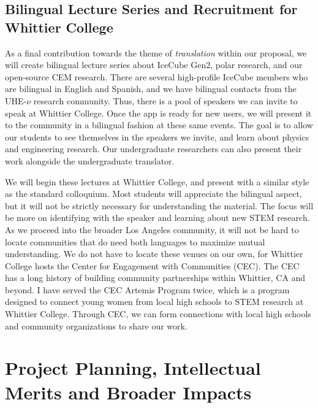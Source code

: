 \documentclass[10pt]{amsart}
\theoremstyle{definition}
\numberwithin{equation}{section}
\begin{document}
\subsection{Bilingual Lecture Series and Recruitment for Whittier College}

As a final contribution towards the theme of \textit{translation} within our proposal, we will create bilingual lecture series about IceCube Gen2, polar research, and our open-source CEM research.  There are several high-profile IceCube members who are bilingual in English and Spanish, and we have bilingual contacts from the UHE-$\nu$ research community.  Thus, there is a pool of speakers we can invite to speak at Whittier College.  Once the app is ready for new users, we will present it to the community in a bilingual fashion at these same events.  The goal is to allow our students to see themselves in the speakers we invite, and learn about physics and engineering research.  Our undergraduate researchers can also present their work alongside the undergraduate translator. 

We will begin these lectures at Whittier College, and present with a similar style as the standard colloquium.  Most students will appreciate the bilingual aspect, but it will not be strictly necessary for understanding the material.  The focus will be more on identifying with the speaker and learning about new STEM research.  As we proceed into the broader Los Angeles community, it will not be hard to locate communities that do need both languages to maximize mutual understanding.  We do not have to locate these venues on our own, for Whittier College hosts the Center for Engagement with Communities (CEC).  The CEC has a long history of building community partnerships within Whittier, CA and beyond.  I have served the CEC Artemis Program twice, which is a program designed to connect young women from local high schools to STEM research at Whittier College.  Through CEC, we can form connections with local high schools and community organizations to share our work.

\section{Project Planning, Intellectual Merits and Broader Impacts}
\label{sec:time_im}
\end{document}
